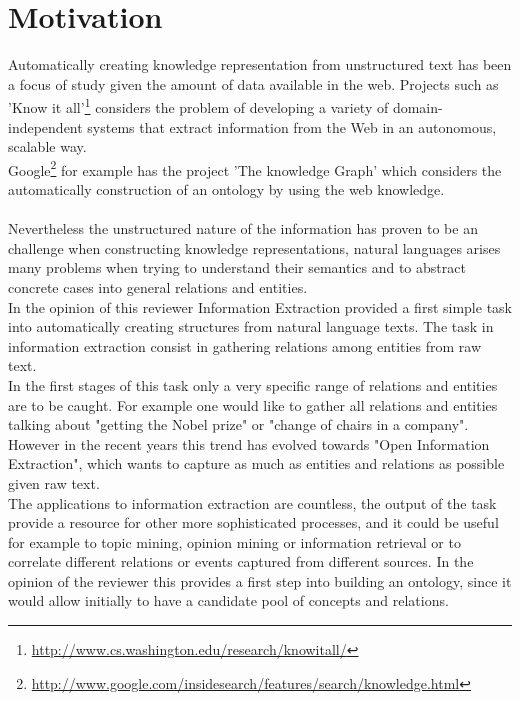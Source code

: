 \documentclass[4pt,a4paper,twocolumn]{article}
\begin{document}
\section{Motivation}

Automatically creating knowledge representation from unstructured text has been a focus of study given the amount of data available in the web.
Projects such as 'Know it all'\footnote{\url{http://www.cs.washington.edu/research/knowitall/}} considers the problem of developing a variety of domain-independent systems that extract information from the Web in an autonomous, scalable way.\\ Google\footnote{\url{http://www.google.com/insidesearch/features/search/knowledge.html}} for example has the project 'The knowledge Graph' which considers the automatically construction of an ontology by using the web knowledge. \\
\\
Nevertheless the unstructured nature of the information has proven to be an challenge when constructing knowledge representations, natural languages arises many problems when trying to understand their semantics and to abstract concrete cases into general relations and entities.\\
In the opinion of this reviewer Information Extraction provided a first simple task into automatically creating structures from natural language texts. The task in information extraction consist in gathering  relations among entities from raw text.\\
In the first stages of this task only a very specific range of relations and entities are to be caught.
For example one would like to gather all relations and entities talking about  "getting the Nobel prize" or "change of chairs in a company".\\
However in the recent years this trend has evolved towards "Open Information Extraction", which wants to capture as much as entities and relations as possible given raw text.\\
The applications to information extraction are countless, the output of the task provide a resource for other more sophisticated processes, and it could be useful for example to topic mining, opinion mining or information retrieval or to correlate different relations or events captured from different sources.
In the opinion of the reviewer this provides a first step into building an ontology, since it would allow initially to have a candidate pool of concepts and relations.\\
\end{document}
